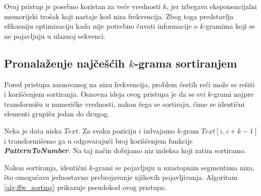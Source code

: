 \documentclass[12pt,oneside]{memoir}
\begin{document}
Ovaj pristup je posebno koristan za veće vrednosti $k$, jer izbegava eksponencijalni memorijski trošak koji nastaje kod niza frekvencija. Zbog toga predstavlja efikasniju optimizaciju kada nije potrebno čuvati informacije o $k$-gramima koji se ne pojavljuju u ulaznoj sekvenci.

\subsection{Pronalaženje najčešćih $k$-grama sortiranjem}
\label{sec:sortiranje}
Pored pristupa zasnovanog na nizu frekvencija, problem čestih reči može se rešiti i korišćenjem sortiranja. Osnovna ideja ovog pristupa je da se svi $k$-grami najpre transformišu u numeričke vrednosti, nakon čega se sortiraju, čime se identični elementi grupišu jedan do drugog.

Neka je data niska $Text$. Za svaku poziciju $i$ izdvajamo $k$-gram $Text[i..i+k-1]$ i transformišemo ga u odgovarajući broj korišćenjem funkcije \textit{\textbf{PatternToNumber}}. Na taj način dobijamo niz indeksa koji zatim sortiramo. 

Nakon sortiranja, identični $k$-grami se pojavljuju u uzastopnim segmentima niza, što omogućava jednostavno prebrojavanje njihovih pojavljivanja. Algoritam \ref{alg:ffw_sorting} prikazuje pseudokod ovog pristupa.

\begin{algorithm}[h]
\caption{Finding Frequent Words by Sorting}
\label{alg:ffw_sorting}
\SetAlgoLined
\DontPrintSemicolon
{}
\end{algorithm}
\end{document}
